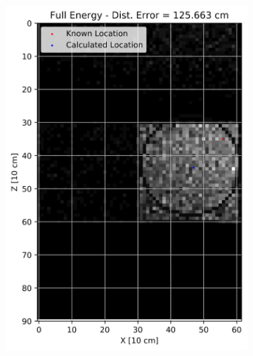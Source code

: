 \begin{figure}[!htb]
\begin{subfigure}[b]{0.15\textwidth}
   \includegraphics[width=1\linewidth]{images/2Cent_Full_2fl_Wall_N}
   \caption{}
   \label{fig:RanF2WN}
\end{subfigure}
\begin{subfigure}[b]{0.15\textwidth}
   \centering

\end{subfigure}
\end{figure}
